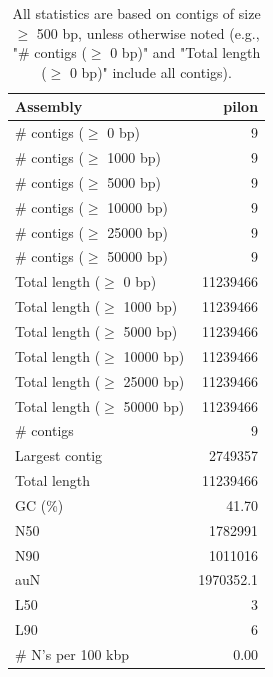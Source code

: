 \documentclass[12pt,a4paper]{article}
\begin{document}
\begin{table}[ht]
\begin{center}
\caption{All statistics are based on contigs of size $\geq$ 500 bp, unless otherwise noted (e.g., "\# contigs ($\geq$ 0 bp)" and "Total length ($\geq$ 0 bp)" include all contigs).}
\begin{tabular}{|l*{1}{|r}|}
\hline
Assembly & pilon \\ \hline
\# contigs ($\geq$ 0 bp) & 9 \\ \hline
\# contigs ($\geq$ 1000 bp) & 9 \\ \hline
\# contigs ($\geq$ 5000 bp) & 9 \\ \hline
\# contigs ($\geq$ 10000 bp) & 9 \\ \hline
\# contigs ($\geq$ 25000 bp) & 9 \\ \hline
\# contigs ($\geq$ 50000 bp) & 9 \\ \hline
Total length ($\geq$ 0 bp) & 11239466 \\ \hline
Total length ($\geq$ 1000 bp) & 11239466 \\ \hline
Total length ($\geq$ 5000 bp) & 11239466 \\ \hline
Total length ($\geq$ 10000 bp) & 11239466 \\ \hline
Total length ($\geq$ 25000 bp) & 11239466 \\ \hline
Total length ($\geq$ 50000 bp) & 11239466 \\ \hline
\# contigs & 9 \\ \hline
Largest contig & 2749357 \\ \hline
Total length & 11239466 \\ \hline
GC (\%) & 41.70 \\ \hline
N50 & 1782991 \\ \hline
N90 & 1011016 \\ \hline
auN & 1970352.1 \\ \hline
L50 & 3 \\ \hline
L90 & 6 \\ \hline
\# N's per 100 kbp & 0.00 \\ \hline
\end{tabular}
\end{center}
\end{table}
\end{document}
